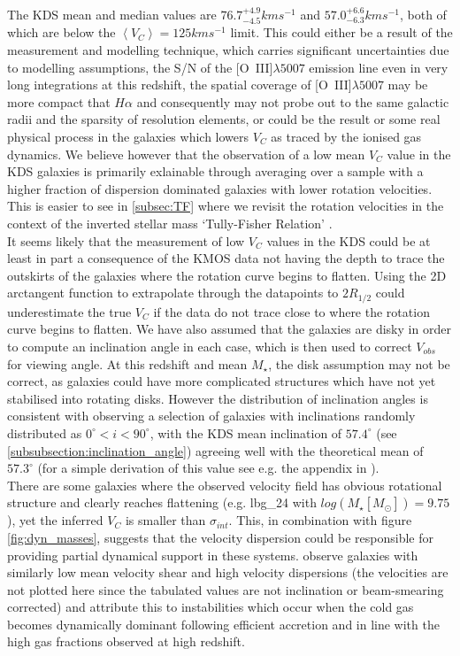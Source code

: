 \documentclass[fleqn,usenatbib]{mn2e}
\begin{document}
The KDS mean and median values are $76.7^{+4.9}_{-4.5}kms^{-1}$ and $57.0^{+6.6}_{-6.3}kms^{-1}$, both of which are below the $\left<V_{C}\right> = 125kms^{-1}$ limit.
This could either be a result of the measurement and modelling technique, which carries significant uncertainties due to modelling assumptions, the S/N of the [O~{\sc III}]$\lambda5007$ emission line even in very long integrations at this redshift, the spatial coverage of [O~{\sc III}]$\lambda5007$ may be more compact that $H\alpha$ and consequently may not probe out to the same galactic radii and the sparsity of resolution elements, or could be the result or some real physical process in the galaxies which lowers $V_{C}$ as traced by the ionised gas dynamics.
We believe however that the observation of a low mean $V_{C}$ value in the KDS galaxies is primarily exlainable through averaging over a sample with a higher fraction of dispersion dominated galaxies with lower rotation velocities.
This is easier to see in \cref{subsec:TF} where we revisit the rotation velocities in the context of the inverted stellar mass `Tully-Fisher Relation' \citep[smTFR;][]{Tully1977,Bell2000a}. \\

It seems likely that the measurement of low $V_{C}$ values in the KDS could be at least in part a consequence of the KMOS data not having the depth to trace the outskirts of the galaxies where the rotation curve begins to flatten.
Using the 2D arctangent function to extrapolate through the datapoints to $2R_{1/2}$ could underestimate the true $V_{C}$ if the data do not trace close to where the rotation curve begins to flatten.
We have also assumed that the galaxies are disky in order to compute an inclination angle in each case, which is then used to correct $V_{obs}$ for viewing angle.
At this redshift and mean $M_{\star}$, the disk assumption may not be correct, as galaxies could have more complicated structures which have not yet stabilised into rotating disks.
However the distribution of inclination angles is consistent with observing a selection of galaxies with inclinations randomly distributed as $0^{\circ} < i < 90^{\circ}$, with the KDS mean inclination of $57.4^{\circ}$ (see \cref{subsubsection:inclination_angle}) agreeing well with the theoretical mean of $57.3^{\circ}$ (for a simple derivation of this value see e.g. the appendix in \cite{Law2009}). \\

There are some galaxies where the observed velocity field has obvious rotational structure and clearly reaches flattening (e.g. lbg\_24 with $log(M_{\star}[M_{\odot}])=9.75$), yet the inferred $V_{C}$ is smaller than $\sigma_{int}$.
This, in combination with figure \ref{fig:dyn_masses}, suggests that the velocity dispersion could be responsible for providing partial dynamical support in these systems.
\cite{Law2009} observe galaxies with similarly low mean velocity shear and high velocity dispersions (the velocities are not plotted here since the tabulated values are not inclination or beam-smearing corrected) and attribute this to instabilities which occur when the cold gas becomes dynamically dominant following efficient accretion and in line with the high gas fractions observed at high redshift. 
\end{document}
